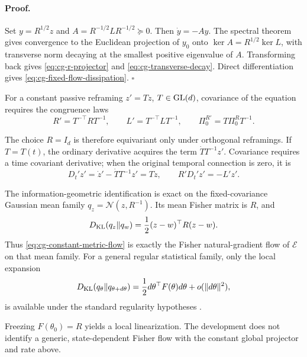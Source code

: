 \paragraph{Proof.}
Set \(y=R^{1/2}z\) and
\(A=R^{-1/2}LR^{-1/2}\succeq0\). Then
\(\dot y=-Ay\). The spectral theorem gives convergence to the Euclidean
projection of \(y_0\) onto \(\ker A=R^{1/2}\ker L\), with transverse norm
decaying at the smallest positive eigenvalue of \(A\). Transforming back
gives \eqref{eq:cg-r-projector} and \eqref{eq:cg-transverse-decay}. Direct
differentiation gives \eqref{eq:cg-fixed-flow-dissipation}. \(\square\)

For a constant passive reframing \(z'=Tz\), \(T\in\mathrm{GL}(d)\), covariance of
the equation requires the congruence laws
\begin{equation}
R'=T^{-\top}RT^{-1},\qquad
L'=T^{-\top}LT^{-1},\qquad
\Pi_0^{R'}=T\Pi_0^RT^{-1}.
\label{eq:cg-flow-congruence}
\end{equation}

The choice \(R=I_d\) is therefore equivariant only
under orthogonal reframings. If \(T=T(t)\), the ordinary derivative acquires
the term \(\dot TT^{-1}z'\). Covariance requires a time covariant derivative;
when the original temporal connection is zero, it is
\begin{equation}
D_t'z'=\dot z'-\dot TT^{-1}z'=T\dot z,
\qquad R'D_t'z'=-L'z'.
\label{eq:cg-time-covariant-flow}
\end{equation}

The information-geometric identification is exact on the fixed-covariance
Gaussian mean family
\(q_z=\mathcal N(z,R^{-1})\). Its mean Fisher matrix is \(R\), and
\begin{equation}
D_{\mathrm{KL}}(q_z\Vert q_w)
=\frac12(z-w)^\top R(z-w).
\label{eq:cg-fixed-covariance-kl}
\end{equation}
Thus \eqref{eq:cg-constant-metric-flow} is exactly the Fisher natural-gradient
flow of \(\mathcal E\) on that mean family. For a general regular statistical
family, only the local expansion
\begin{equation}
D_{\mathrm{KL}}(q_\theta\Vert q_{\theta+d\theta})
=\frac12d\theta^\top F(\theta)d\theta
+o(\|d\theta\|^2),
\label{eq:cg-local-fisher-kl}
\end{equation}
is available under the standard regularity hypotheses
\citep{AmariNagaoka2000}. 

Freezing
\(F(\theta_0)=R\) yields a local linearization. The development does not
identify a generic, state-dependent Fisher flow with the constant global
projector and rate above. 

